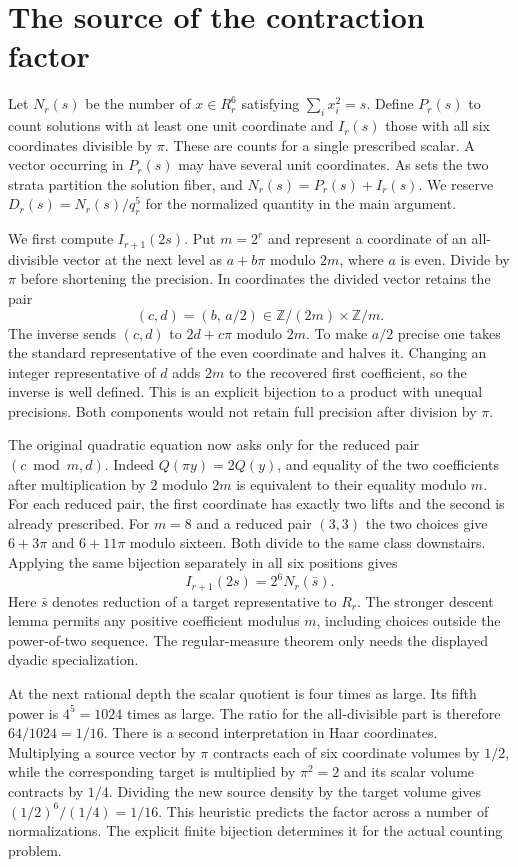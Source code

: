 \documentclass[12pt,letterpaper]{article}
\begin{document}
\section{The source of the contraction factor}
Let $N_r(s)$ be the number of $x\in R_r^6$ satisfying $\sum_i x_i^2=s$. Define $P_r(s)$ to count solutions with at least one unit coordinate and $I_r(s)$ those with all six coordinates divisible by $\pi$. These are counts for a single prescribed scalar. A vector occurring in $P_r(s)$ may have several unit coordinates. As sets the two strata partition the solution fiber, and $N_r(s)=P_r(s)+I_r(s)$. We reserve $D_r(s)=N_r(s)/q_r^5$ for the normalized quantity in the main argument.

We first compute $I_{r+1}(2s)$. Put $m=2^r$ and represent a coordinate of an all-divisible vector at the next level as $a+b\pi$ modulo $2m$, where $a$ is even. Divide by $\pi$ before shortening the precision. In coordinates the divided vector retains the pair
\[
   (c,d)=(b,\,a/2)\in \mathbb Z/(2m)\times\mathbb Z/m.
\]
The inverse sends $(c,d)$ to $2d+c\pi$ modulo $2m$. To make $a/2$ precise one takes the standard representative of the even coordinate and halves it. Changing an integer representative of $d$ adds $2m$ to the recovered first coefficient, so the inverse is well defined. This is an explicit bijection to a product with unequal precisions. Both components would not retain full precision after division by $\pi$.

The original quadratic equation now asks only for the reduced pair $(c\bmod m,d)$. Indeed $Q(\pi y)=2Q(y)$, and equality of the two coefficients after multiplication by $2$ modulo $2m$ is equivalent to their equality modulo $m$. For each reduced pair, the first coordinate has exactly two lifts and the second is already prescribed. For $m=8$ and a reduced pair $(3,3)$ the two choices give $6+3\pi$ and $6+11\pi$ modulo sixteen. Both divide to the same class downstairs. Applying the same bijection separately in all six positions gives
\[
                    I_{r+1}(2s)=2^6 N_r(\bar s).
\]
Here $\bar s$ denotes reduction of a target representative to $R_r$. The stronger descent lemma permits any positive coefficient modulus $m$, including choices outside the power-of-two sequence. The regular-measure theorem only needs the displayed dyadic specialization.

At the next rational depth the scalar quotient is four times as large. Its fifth power is $4^5=1024$ times as large. The ratio for the all-divisible part is therefore $64/1024=1/16$. There is a second interpretation in Haar coordinates. Multiplying a source vector by $\pi$ contracts each of six coordinate volumes by $1/2$, while the corresponding target is multiplied by $\pi^2=2$ and its scalar volume contracts by $1/4$. Dividing the new source density by the target volume gives $(1/2)^6/(1/4)=1/16$. This heuristic predicts the factor across a number of normalizations. The explicit finite bijection determines it for the actual counting problem.
\end{document}
